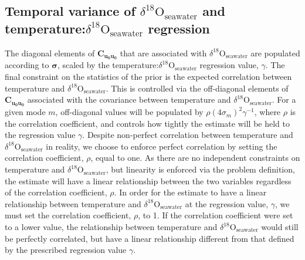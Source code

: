 \documentclass[draft]{agujournal2019}
\begin{document}
\subsection{Temporal variance of $\delta^{18}\mathrm{O}_{\mathrm{seawater}}$ and temperature:$\delta^{18}\mathrm{O}_{\mathrm{seawater}}$ regression \label{sec:oxygenvar}}

The diagonal elements of $\mathbf{C_{u_{0}u_0}}$ that are associated with $\delta^{18}\mathrm{O}_{\mathrm{seawater}}$ are populated according to $\bm{\sigma}$, scaled by the temperature:$\delta^{18}\mathrm{O}_{\mathrm{seawater}}$ regression value, $\gamma$. The final constraint on the statistics of the prior is the expected correlation between temperature and $\delta^{18}\mathrm{O}_{\mathrm{seawater}}$. This is controlled via the off-diagonal elements of $\mathbf{C_{u_0u_0}}$ associated with the covariance between temperature and $\delta^{18}\mathrm{O}_{\mathrm{seawater}}$. For a given mode $m$, off-diagonal values will be populated by  $\rho (4\sigma_m)^2\gamma^{-1}$, where $\rho$ is the correlation coefficient, and controls how tightly the estimate will be held to the regression value $\gamma$. Despite non-perfect correlation between temperature and $\delta^{18}\mathrm{O}_{\mathrm{seawater}}$ in reality, we choose to enforce perfect correlation by setting the correlation coefficient, $\rho$, equal to one. As there are no independent constraints on temperature and $\delta^{18}\mathrm{O}_{\mathrm{seawater}}$, but linearity is enforced via the problem definition, the estimate will have a linear relationship between the two variables regardless of the correlation coefficient, $\rho$. In order for the estimate to have a linear relationship between temperature and $\delta^{18}\mathrm{O}_{\mathrm{seawater}}$ at the regression value, $\gamma$, we must set the correlation coefficient, $\rho$, to 1. If the correlation coefficient were set to a lower value, the relationship between temperature and $\delta^{18}\mathrm{O}_{\mathrm{seawater}}$ would still be perfectly correlated, but have a linear relationship different from that defined by the prescribed regression value $\gamma$.
\end{document}
